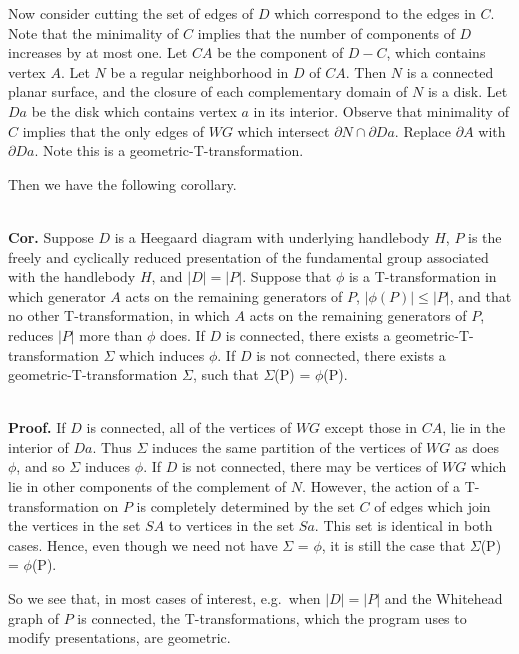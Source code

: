\documentclass[12pt]{amsart}
\newcommand{\corollary}{\ \\ \noindent \textbf{Cor.} }
\newcommand{\pf}{\ \\ \noindent \textbf{Proof.} }
\begin{document}
                Now consider cutting the set of edges of $D$ which correspond to the edges in $C$. Note
        that the minimality of $C$ implies that the number of components of $D$ increases by at most
        one. Let $CA$ be the component of $D - C$, which contains vertex $A$. Let $N$ be a regular
        neighborhood in $D$ of $CA$. Then $N$ is a connected planar surface, and the closure of each
        complementary domain of $N$ is a disk. Let $Da$ be the disk which contains vertex $a$ in its
        interior. Observe that minimality of $C$ implies that the only edges of $WG$ which intersect
        $\partial N \cap \partial Da$. Replace $\partial A$ with $\partial Da$. Note this is a geometric-T-transformation.
        
                Then we have the following corollary.
        
        \corollary Suppose $D$ is a Heegaard diagram with underlying handlebody $H$, $P$ is the freely and
        cyclically reduced presentation of the fundamental group associated with the handlebody
        $H$, and $|D| = |P|$. Suppose that $\phi$ is a T-transformation in which generator $A$ acts on the
        remaining generators of $P$, $|\phi(P)| \leq |P|$, and that no other T-transformation, in which $A$
        acts on the remaining generators of $P$, reduces $|P|$ more than $\phi$ does. If $D$ is connected,
        there exists a geometric-T-transformation $\Sigma$ which induces $\phi$. If $D$ is not connected, there
        exists a geometric-T-transformation $\Sigma$, such that $\Sigma$(P) = $\phi$(P).
        
        \pf   If $D$ is connected, all of the vertices of $WG$ except those in $CA$, lie in the
        interior of $Da$. Thus $\Sigma$ induces the same partition of the vertices of $WG$ as does $\phi$, and
        so $\Sigma$ induces $\phi$. If $D$ is not connected, there may be vertices of $WG$ which lie in other
        components of the complement of $N$. However, the action of a T-transformation on $P$ is
        completely determined by the set $C$ of edges which join the vertices in the set $SA$ to 
        vertices in the set $Sa$. This set is identical in both cases. Hence, even though we need
        not have $\Sigma$ = $\phi$, it is still the case that $\Sigma$(P) = $\phi$(P).
        
                So we see that, in most cases of interest, e.g.~when $|D| = |P|$ and the Whitehead graph
        of $P$ is connected, the T-transformations, which the program uses to modify presentations,
        are geometric.
\end{document}
